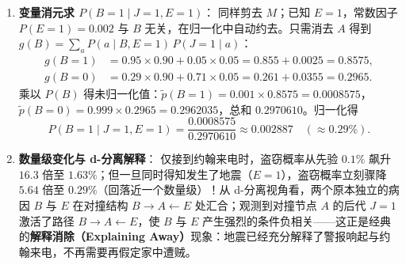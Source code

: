 \begin{enumerate}[label=(\arabic*), leftmargin=1.8em]
\begin{itemize}
\[    \]
  \end{itemize}
  \item \textbf{变量消元求 $P(B=1 \mid J=1, E=1)$}：
  同样剪去 $M$；已知 $E=1$，常数因子 $P(E=1)=0.002$ 与 $B$ 无关，在归一化中自动约去。只需消去 $A$ 得到 $g(B) = \sum_a P(a \mid B, E=1)\, P(J=1 \mid a)$：
  \begin{align*}
    g(B=1) &= 0.95 \times 0.90 + 0.05 \times 0.05 = 0.855 + 0.0025 = 0.8575, \\
    g(B=0) &= 0.29 \times 0.90 + 0.71 \times 0.05 = 0.261 + 0.0355 = 0.2965.
  \end{align*}
  乘以 $P(B)$ 得未归一化值：$\tilde{p}(B=1) = 0.001 \times 0.8575 = 0.0008575$，$\tilde{p}(B=0) = 0.999 \times 0.2965 = 0.2962035$，总和 $0.2970610$。归一化得
  \[
    P(B=1 \mid J=1, E=1) = \frac{0.0008575}{0.2970610} \approx \mathbf{0.002887} \quad (\approx 0.29\%).
  \]
  \item \textbf{数量级变化与 d-分离解释}：
  仅接到约翰来电时，盗窃概率从先验 $0.1\%$ 飙升 $16.3$ 倍至 $1.63\%$；但一旦同时得知发生了地震（$E=1$），盗窃概率立刻骤降 $\mathbf{5.64}$ 倍至 $0.29\%$（回落近一个数量级）！从 d-分离视角看，两个原本独立的病因 $B$ 与 $E$ 在对撞结构 $B \to A \leftarrow E$ 处汇合；观测到对撞节点 $A$ 的后代 $J=1$ 激活了路径 $B \to A \leftarrow E$，使 $B$ 与 $E$ 产生强烈的条件负相关——这正是经典的\textbf{解释消除（Explaining Away）}现象：地震已经充分解释了警报响起与约翰来电，不再需要再假定家中遭贼。
\end{enumerate}

